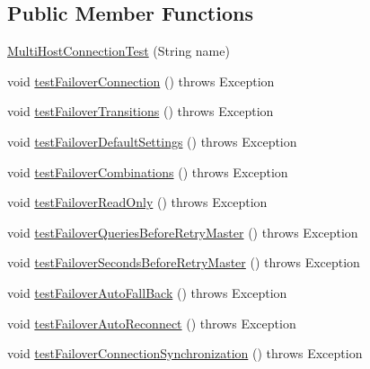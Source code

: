 \subsection*{Public Member Functions}
\begin{DoxyCompactItemize}
\item 
\mbox{\hyperlink{classtestsuite_1_1simple_1_1_multi_host_connection_test_a56eb52dfde0f334b08b56d1065f60104}{Multi\+Host\+Connection\+Test}} (String name)
\item 
void \mbox{\hyperlink{classtestsuite_1_1simple_1_1_multi_host_connection_test_ad753dcc54daa643efb93bb6296b446fb}{test\+Failover\+Connection}} ()  throws Exception 
\item 
void \mbox{\hyperlink{classtestsuite_1_1simple_1_1_multi_host_connection_test_ac73ab69db61b63a684b6d229fb83e97b}{test\+Failover\+Transitions}} ()  throws Exception 
\item 
void \mbox{\hyperlink{classtestsuite_1_1simple_1_1_multi_host_connection_test_ab41d61126e424b0903c7a6411d40a213}{test\+Failover\+Default\+Settings}} ()  throws Exception 
\item 
void \mbox{\hyperlink{classtestsuite_1_1simple_1_1_multi_host_connection_test_a3d67cb5298918a721fd213e23aad5d22}{test\+Failover\+Combinations}} ()  throws Exception 
\item 
void \mbox{\hyperlink{classtestsuite_1_1simple_1_1_multi_host_connection_test_a584998fbe06309864c8e535923ca3c2f}{test\+Failover\+Read\+Only}} ()  throws Exception 
\item 
void \mbox{\hyperlink{classtestsuite_1_1simple_1_1_multi_host_connection_test_a4497dff5cf4989cdacb5d7a771f8469a}{test\+Failover\+Queries\+Before\+Retry\+Master}} ()  throws Exception 
\item 
void \mbox{\hyperlink{classtestsuite_1_1simple_1_1_multi_host_connection_test_aac51a7111324e60d07760b3e52d7e2ea}{test\+Failover\+Seconds\+Before\+Retry\+Master}} ()  throws Exception 
\item 
void \mbox{\hyperlink{classtestsuite_1_1simple_1_1_multi_host_connection_test_adcb3eebcf1b9b863bf7c3e55e3af53f7}{test\+Failover\+Auto\+Fall\+Back}} ()  throws Exception 
\item 
void \mbox{\hyperlink{classtestsuite_1_1simple_1_1_multi_host_connection_test_a17cbfd2022e45098966fc67a16d7988a}{test\+Failover\+Auto\+Reconnect}} ()  throws Exception 
\item 
void \mbox{\hyperlink{classtestsuite_1_1simple_1_1_multi_host_connection_test_ac71b84115cf53abe97e4c697a4a6fd39}{test\+Failover\+Connection\+Synchronization}} ()  throws Exception 
\end{DoxyCompactItemize}
